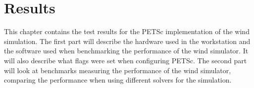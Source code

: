 \chapter{Results}
\label{chap:results}

This chapter contains the test results for the PETSc implementation of the wind
simulation. The first part will describe the hardware used in the workstation
and the software used when benchmarking the performance of the
wind simulator. It will also describe what flags were set when configuring PETSc.
The second part will look at benchmarks measuring the performance of the
wind simulator, comparing the performance when using different solvers for the
simulation.




